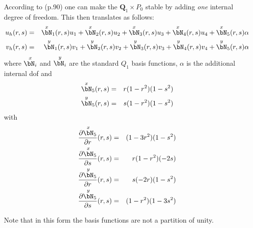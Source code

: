 According to \textcite{bobf08} (p.90) one can make the ${\bm Q}_1 \times P_0$ stable by adding {\it one}
internal degree of freedom. This then translates as follows:
\begin{eqnarray}
u_h(r,s) &=& 
\overset{\tiny x}{\bN}_1(r,s) u_1 +
\overset{\tiny x}{\bN}_2(r,s) u_2 +
\overset{\tiny x}{\bN}_3(r,s) u_3 +
\overset{\tiny x}{\bN}_4(r,s) u_4 + 
\overset{\tiny x}{\bN}_5(r,s) \alpha \\
v_h(r,s) &=& 
\overset{\small y}{\bN}_1(r,s) v_1 +
\overset{\small y}{\bN}_2(r,s) v_2 +
\overset{\small y}{\bN}_3(r,s) v_3 +
\overset{\small y}{\bN}_4(r,s) v_4 + 
\overset{\small y}{\bN}_5(r,s) \alpha 
\end{eqnarray}
where $\overset{\small x}{\bN_i}$ and $\overset{\small y}{\bN_i}$ 
are the standard $Q_1$ basis functions, $\alpha$ is the additional 
internal dof and 
\begin{eqnarray}
\overset{\small x}{\bN}_5(r,s) &=& r(1-r^2)(1-s^2) \\
\overset{\small y}{\bN}_5(r,s) &=& s(1-r^2)(1-s^2) 
\end{eqnarray}
with
\begin{eqnarray}
\frac{\partial \overset{\small x}{\bN}_5}{\partial r}(r,s) &=& (1-3r^2)(1-s^2) \\
\frac{\partial \overset{\small x}{\bN}_5}{\partial s}(r,s) &=& r(1-r^2)(-2s) \\
\frac{\partial \overset{\small y}{\bN}_5}{\partial r}(r,s) &=& s(-2r)(1-s^2) \\
\frac{\partial \overset{\small y}{\bN}_5}{\partial s}(r,s) &=& (1-r^2)(1-3s^2) 
\end{eqnarray}

Note that in this form the basis functions are not a partition of unity.


